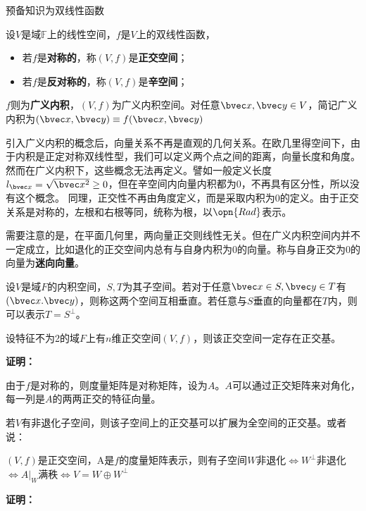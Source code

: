 

\begin{issues}
\issueDraft 预备知识为双线性函数
\end{issues}

\begin{definition}{}
设$V$是域$\mathbb F$上的线性空间，$f$是$V$上的双线性函数，
\begin{itemize}
\item 若$f$是\textbf{对称的}，称$(V,f)$是\textbf{正交空间}；
\item 若$f$是\textbf{反对称的}，称$(V,f)$是\textbf{辛空间}；
\end{itemize}
$f$则为\textbf{广义内积}，$(V,f)$为广义内积空间。对任意$\bvec x,\bvec y\in V$，简记广义内积为$(\bvec x,\bvec y)\equiv f(\bvec x,\bvec y)$
\end{definition}
引入广义内积的概念后，向量关系不再是直观的几何关系。在欧几里得空间下，由于内积是正定对称双线性型，我们可以定义两个点之间的距离，向量长度和角度。然而在广义内积下，这些概念无法再定义。譬如一般定义长度$l_{\bvec x}=\sqrt{\bvec x^2}\ge 0$，但在辛空间内向量内积都为0，不再具有区分性，所以没有这个概念。
同理，正交性不再由角度定义，而是采取内积为$0$的定义。由于正交关系是对称的，左根和右根等同，统称为根，以$\opn{Rad}$表示。

需要注意的是，在平面几何里，两向量正交则线性无关。但在广义内积空间内并不一定成立，比如退化的正交空间内总有与自身内积为0的向量。称与自身正交为$0$的向量为\textbf{迷向向量}。

\begin{definition}{}
设$V$是域$F$的内积空间，$S,T$为其子空间。若对于任意$\bvec x\in S,\bvec  y\in T$有$(\bvec x.\bvec y)$，则称这两个空间互相垂直。若任意与$S$垂直的向量都在$T$内，则可以表示$T=S^{\bot}$。
\end{definition}
\begin{theorem}{}
设特征不为2的域$F$上有$n$维正交空间$(V,f)$，则该正交空间一定存在正交基。
\end{theorem}
\textbf{证明：}

由于$f$是对称的，则度量矩阵是对称矩阵，设为$A$。$A$可以通过正交矩阵来对角化，每一列是$A$的两两正交的特征向量。

若$V$有非退化子空间，则该子空间上的正交基可以扩展为全空间的正交基。或者说：

\begin{theorem}{}
$(V,f)$是正交空间，A是$f$的度量矩阵表示，则有子空间$W$非退化$\Longleftrightarrow  W^{\bot}$非退化$\Longleftrightarrow A|_{W}$满秩$\Longleftrightarrow V=W\oplus W^{\bot} $
\end{theorem}
\textbf{证明：}


